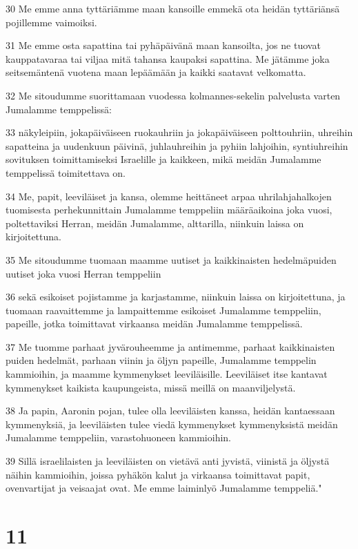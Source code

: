 \par 30 Me emme anna tyttäriämme maan kansoille emmekä ota heidän tyttäriänsä pojillemme vaimoiksi.
\par 31 Me emme osta sapattina tai pyhäpäivänä maan kansoilta, jos ne tuovat kauppatavaraa tai viljaa mitä tahansa kaupaksi sapattina. Me jätämme joka seitsemäntenä vuotena maan lepäämään ja kaikki saatavat velkomatta.
\par 32 Me sitoudumme suorittamaan vuodessa kolmannes-sekelin palvelusta varten Jumalamme temppelissä:
\par 33 näkyleipiin, jokapäiväiseen ruokauhriin ja jokapäiväiseen polttouhriin, uhreihin sapatteina ja uudenkuun päivinä, juhlauhreihin ja pyhiin lahjoihin, syntiuhreihin sovituksen toimittamiseksi Israelille ja kaikkeen, mikä meidän Jumalamme temppelissä toimitettava on.
\par 34 Me, papit, leeviläiset ja kansa, olemme heittäneet arpaa uhrilahjahalkojen tuomisesta perhekunnittain Jumalamme temppeliin määräaikoina joka vuosi, poltettaviksi Herran, meidän Jumalamme, alttarilla, niinkuin laissa on kirjoitettuna.
\par 35 Me sitoudumme tuomaan maamme uutiset ja kaikkinaisten hedelmäpuiden uutiset joka vuosi Herran temppeliin
\par 36 sekä esikoiset pojistamme ja karjastamme, niinkuin laissa on kirjoitettuna, ja tuomaan raavaittemme ja lampaittemme esikoiset Jumalamme temppeliin, papeille, jotka toimittavat virkaansa meidän Jumalamme temppelissä.
\par 37 Me tuomme parhaat jyvärouheemme ja antimemme, parhaat kaikkinaisten puiden hedelmät, parhaan viinin ja öljyn papeille, Jumalamme temppelin kammioihin, ja maamme kymmenykset leeviläisille. Leeviläiset itse kantavat kymmenykset kaikista kaupungeista, missä meillä on maanviljelystä.
\par 38 Ja papin, Aaronin pojan, tulee olla leeviläisten kanssa, heidän kantaessaan kymmenyksiä, ja leeviläisten tulee viedä kymmenykset kymmenyksistä meidän Jumalamme temppeliin, varastohuoneen kammioihin.
\par 39 Sillä israelilaisten ja leeviläisten on vietävä anti jyvistä, viinistä ja öljystä näihin kammioihin, joissa pyhäkön kalut ja virkaansa toimittavat papit, ovenvartijat ja veisaajat ovat. Me emme laiminlyö Jumalamme temppeliä."

\chapter{11}

